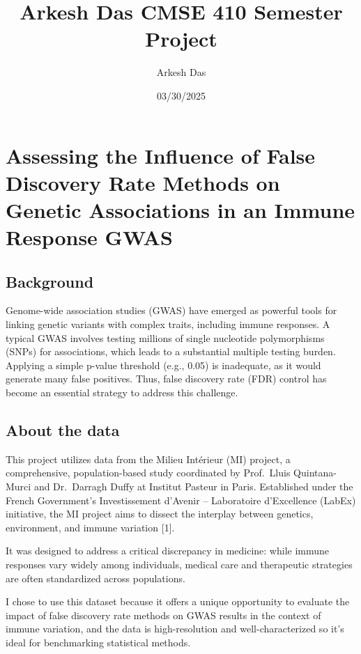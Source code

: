 \documentclass[
  12pt,
]{article}
\title{Arkesh Das CMSE 410 Semester Project}
\author{Arkesh Das}
\date{03/30/2025}
\begin{document}
\maketitle

\section{Assessing the Influence of False Discovery Rate Methods on
Genetic Associations in an Immune Response
GWAS}\label{assessing-the-influence-of-false-discovery-rate-methods-on-genetic-associations-in-an-immune-response-gwas}

\subsection{Background}\label{background}

Genome-wide association studies (GWAS) have emerged as powerful tools
for linking genetic variants with complex traits, including immune
responses. A typical GWAS involves testing millions of single nucleotide
polymorphisms (SNPs) for associations, which leads to a substantial
multiple testing burden. Applying a simple p-value threshold (e.g.,
0.05) is inadequate, as it would generate many false positives. Thus,
false discovery rate (FDR) control has become an essential strategy to
address this challenge.

\subsection{About the data}\label{about-the-data}

This project utilizes data from the Milieu Intérieur (MI) project, a
comprehensive, population-based study coordinated by Prof.~Lluis
Quintana-Murci and Dr.~Darragh Duffy at Institut Pasteur in Paris.
Established under the French Government's Investissement d'Avenir --
Laboratoire d'Excellence (LabEx) initiative, the MI project aims to
dissect the interplay between genetics, environment, and immune
variation {[}1{]}.

It was designed to address a critical discrepancy in medicine: while
immune responses vary widely among individuals, medical care and
therapeutic strategies are often standardized across populations.

I chose to use this dataset because it offers a unique opportunity to
evaluate the impact of false discovery rate methods on GWAS results in
the context of immune variation, and the data is high-resolution and
well-characterized so it's ideal for benchmarking statistical methods.
\end{document}
